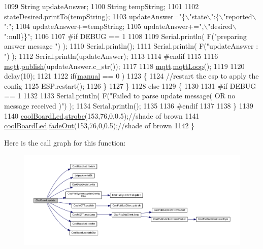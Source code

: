\begin{DoxyCode}
1099             String updateAnswer;
1100             String tempString;
1101             
1102             stateDesired.printTo(tempString);
1103             updateAnswer=\textcolor{stringliteral}{"\{\(\backslash\)"state\(\backslash\)":\{\(\backslash\)"reported\(\backslash\)":"};
1104             updateAnswer+=tempString;
1105             updateAnswer+=\textcolor{stringliteral}{",\(\backslash\)"desired\(\backslash\)":null\}\}"};
1106 
1107 \textcolor{preprocessor}{        #if DEBUG == 1}
1108 
1109             Serial.println( F(\textcolor{stringliteral}{"preparing answer message "}) );
1110             Serial.println();
1111             Serial.println( F(\textcolor{stringliteral}{"updateAnswer : "}) );
1112             Serial.println(updateAnswer);
1113         
1114 \textcolor{preprocessor}{        #endif  }
1115 
1116             \hyperlink{class_cool_board_a2399f44d7c23c1149a335cb3b46d90f1}{mqtt}.\hyperlink{class_cool_m_q_t_t_ace977b3e90ab14b1199fe5c4fb0a13ec}{publish}(updateAnswer.c\_str());
1117             
1118             \hyperlink{class_cool_board_a2399f44d7c23c1149a335cb3b46d90f1}{mqtt}.\hyperlink{class_cool_m_q_t_t_aa5eaae967b562b62cbcf2b8d81f6e5d5}{mqttLoop}();
1119 
1120             delay(10);
1121         
1122             \textcolor{keywordflow}{if}(\hyperlink{class_cool_board_a7c8e505a5804b109e112d5a03df6ea2b}{manual} == 0 )
1123             \{
1124                 \textcolor{comment}{//restart the esp to apply the config}
1125                 ESP.restart();
1126             \}
1127     \}
1128     \textcolor{keywordflow}{else}
1129     \{
1130     
1131 \textcolor{preprocessor}{    #if DEBUG == 1}
1132 
1133         Serial.println( F(\textcolor{stringliteral}{"Failed to parse update message( OR no message received )"}) );
1134         Serial.println();
1135     
1136 \textcolor{preprocessor}{    #endif}
1137     
1138     \}
1139 
1140     \hyperlink{class_cool_board_a1b1d3c684a5baa56b08486e192fd8e97}{coolBoardLed}.\hyperlink{class_cool_board_led_ad5f0de4c628cbfbf49896042831c64ad}{strobe}(153,76,0,0.5);\textcolor{comment}{//shade of brown}
1141     \hyperlink{class_cool_board_a1b1d3c684a5baa56b08486e192fd8e97}{coolBoardLed}.\hyperlink{class_cool_board_led_a93d545679237e8cc858324367149775c}{fadeOut}(153,76,0,0.5);\textcolor{comment}{//shade of brown                              }
1142 \}
\end{DoxyCode}
Here is the call graph for this function\+:\nopagebreak
\begin{figure}[H]
\begin{center}
\leavevmode
\includegraphics[width=350pt]{d7/df9/class_cool_board_a8612756d3f73198cdde857a66f0fe690_cgraph}
\end{center}
\end{figure}
